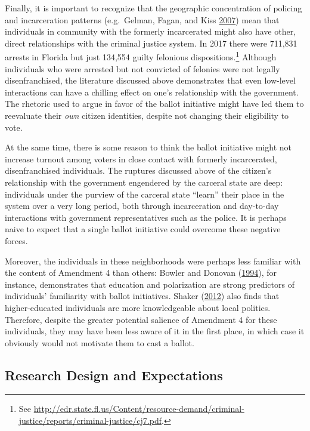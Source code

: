 \documentclass[
  12pt,
]{article}
\begin{document}
Finally, it is important to recognize that the geographic concentration of policing and incarceration patterns (e.g.~Gelman, Fagan, and Kiss \protect\hyperlink{ref-Gelman2007}{2007}) mean that individuals in community with the formerly incarcerated might also have other, direct relationships with the criminal justice system. In 2017 there were 711,831 arrests in Florida but just 134,554 guilty felonious dispositions.\footnote{See \url{http://edr.state.fl.us/Content/resource-demand/criminal-justice/reports/criminal-justice/cj7.pdf}.} Although individuals who were arrested but not convicted of felonies were not legally disenfranchised, the literature discussed above demonstrates that even low-level interactions can have a chilling effect on one's relationship with the government. The rhetoric used to argue in favor of the ballot initiative might have led them to reevaluate their \emph{own} citizen identities, despite not changing their eligibility to vote.

At the same time, there is some reason to think the ballot initiative might not increase turnout among voters in close contact with formerly incarcerated, disenfranchised individuals. The ruptures discussed above of the citizen's relationship with the government engendered by the carceral state are deep: individuals under the purview of the carceral state ``learn'' their place in the system over a very long period, both through incarceration and day-to-day interactions with government representatives such as the police. It is perhaps naive to expect that a single ballot initiative could overcome these negative forces.

Moreover, the individuals in these neighborhoods were perhaps less familiar with the content of Amendment 4 than others: Bowler and Donovan (\protect\hyperlink{ref-Bowler1994}{1994}), for instance, demonstrates that education and polarization are strong predictors of individuals' familiarity with ballot initiatives. Shaker (\protect\hyperlink{ref-Shaker2012}{2012}) also finds that higher-educated individuals are more knowledgeable about local politics. Therefore, despite the greater potential salience of Amendment 4 for these individuals, they may have been less aware of it in the first place, in which case it obviously would not motivate them to cast a ballot.

\hypertarget{research-design-and-expectations}{%
\subsection*{Research Design and Expectations}\label{research-design-and-expectations}}
\end{document}

